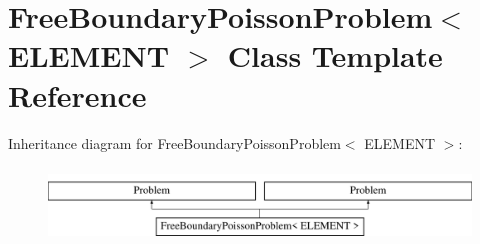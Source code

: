 \hypertarget{classFreeBoundaryPoissonProblem}{}\section{Free\+Boundary\+Poisson\+Problem$<$ E\+L\+E\+M\+E\+NT $>$ Class Template Reference}
\label{classFreeBoundaryPoissonProblem}
Inheritance diagram for Free\+Boundary\+Poisson\+Problem$<$ E\+L\+E\+M\+E\+NT $>$\+:\begin{figure}[H]
\begin{center}
\leavevmode
\includegraphics[height=2.000000cm]{classFreeBoundaryPoissonProblem}
\end{center}
\end{figure}
